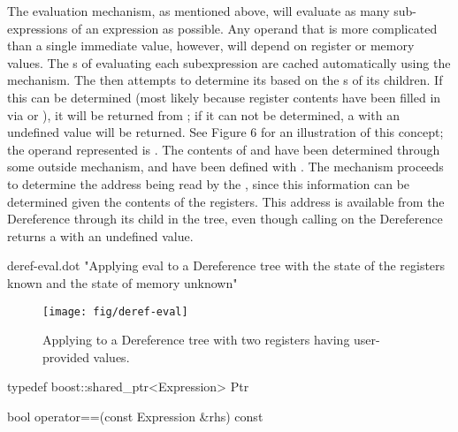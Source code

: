 \begin{apient}
The evaluation mechanism, as mentioned above, will evaluate as many
sub-\/expressions of an expression as possible. Any operand that is more
complicated than a single immediate value, however, will depend on register or
memory values. The s of evaluating each subexpression are cached
automatically using the  mechanism. The  then attempts
to determine its  based on the s of its children. If this  can
be determined (most likely because register contents have been filled in via
 or ), it will be returned from ; if it can
not be determined, a  with an undefined value will be returned. See Figure
6 for an illustration of this concept; the operand represented is 
. 
The contents of  and  have been determined through some
outside mechanism, and have been defined with . The 
mechanism proceeds to determine the address being read by the , since
this information can be determined given the contents of the registers. This
address is available from the Dereference through its child in the tree, even
though calling  on the Dereference returns a  with an
undefined value.

\dotfile deref-eval.dot
"Applying eval to a Dereference tree with the state of the registers known and the state of memory unknown"

\begin{figure}
    \centering
\texttt{[image: fig/deref-eval]}
\caption{Applying  to a Dereference tree with two registers
having user-provided values.}
\label{fig:deref-eval}
\end{figure}

\begin{apient}
typedef boost::shared_ptr<Expression> Ptr
\end{apient}

\begin{apient}
bool operator==(const Expression &rhs) const  
\end{apient}


\end{apient}
